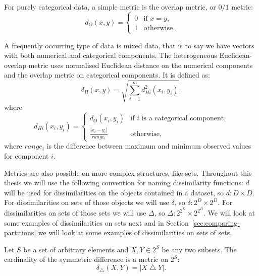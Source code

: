 \documentclass[a4paper]{report}
\DeclareMathOperator{\symdif}{\bigtriangleup}
\newcommand{\dset}{D}
\newcommand{\psettimes}{\! \times}
\newcommand{\pspsettimes}{\! \! \times}
\begin{document}
For purely categorical data, a simple metric is the overlap metric, or $0/1$
metric:
\begin{equation*}
  d_O(x,y) =
  \begin{cases}
    0 & \text{if $x=y$,} \\
    1 & \text{otherwise.}
  \end{cases}
\end{equation*}

A frequently occurring type of data is mixed data, that is to say we have
vectors with both numerical and categorical components.  The heterogeneous
Euclidean-overlap metric uses normalised Euclidean distance on the numerical
components and the overlap metric on categorical components.  It is defined
as:
\begin{equation*}
  d_{H}(x,y) = \sqrt{\sum_{i=1}^{m} d_{Hi}^2(x_i,y_i)},
\end{equation*}
where
\begin{equation*}
  d_{Hi}(x_i,y_i) =
  \begin{cases}
    d_O(x_i,y_i) & \text{if $i$ is a categorical component,} \\
    \displaystyle \frac{|x_i-y_i|}{range_i} & \text{otherwise,}
  \end{cases}
\end{equation*}
where $range_i$ is the difference between maximum and minimum observed values
for component $i$.

Metrics are also possible on more complex structures, like sets.  Throughout
this thesis we will use the following convention for naming dissimilarity
functions: $d$ will be used for dissimilarities on the objects contained in a
dataset, so $d \colon \dset \times \dset$.  For dissimilarities on sets of
those objects we will use $\delta$, so $\delta \colon 2^{\dset} \psettimes
2^{\dset}$.  For dissimilarities on sets of those sets we will use $\Delta$,
so $\Delta \colon 2^{2^{\dset}} \pspsettimes 2^{2^{\dset}}$.  We will look at
some examples of dissimilarities on sets next and in
Section~\ref{sec:comparing-partitions} we will look at some examples of
dissimilarities on sets of sets.

Let $S$ be a set of arbitrary elements and $X,Y \in 2^{S}$ be any two subsets.
The cardinality of the symmetric difference is a metric on $2^{S}$:
\begin{equation*}
  \delta_{\symdif}(X,Y) = |X \symdif Y|.
\end{equation*}
\end{document}
